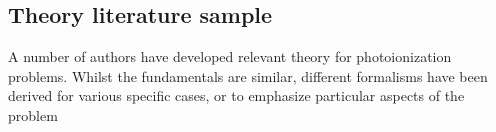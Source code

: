 \subsection{Theory literature sample\label{sec:theory-lit}}

A number of authors have developed relevant theory for photoionization problems. Whilst the fundamentals are similar, different formalisms have been derived for various specific cases, or to emphasize particular aspects of the problem